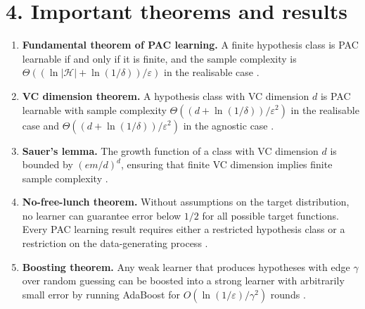 \section*{4. Important theorems and results}
\begin{enumerate}[leftmargin=*,itemsep=0.35em]
\item \textbf{Fundamental theorem of PAC learning.} A finite hypothesis class is PAC learnable if and only if it is finite, and the sample complexity is $\Theta((\ln|\mathcal H|+\ln(1/\delta))/\varepsilon)$ in the realisable case \cite{colt_ref1}.

\item \textbf{VC dimension theorem.} A hypothesis class with VC dimension $d$ is PAC learnable with sample complexity $\Theta((d+\ln(1/\delta))/\varepsilon^2)$ in the realisable case and $\Theta((d+\ln(1/\delta))/\varepsilon^2)$ in the agnostic case \cite{colt_ref2}.

\item \textbf{Sauer's lemma.} The growth function of a class with VC dimension $d$ is bounded by $(em/d)^d$, ensuring that finite VC dimension implies finite sample complexity \cite{colt_ref2}.

\item \textbf{No-free-lunch theorem.} Without assumptions on the target distribution, no learner can guarantee error below $1/2$ for all possible target functions. Every PAC learning result requires either a restricted hypothesis class or a restriction on the data-generating process \cite{colt_ref1}.

\item \textbf{Boosting theorem.} Any weak learner that produces hypotheses with edge $\gamma$ over random guessing can be boosted into a strong learner with arbitrarily small error by running AdaBoost for $O(\ln(1/\varepsilon)/\gamma^2)$ rounds \cite{colt_ref3}.
\end{enumerate}

\theoryapplications
{}
